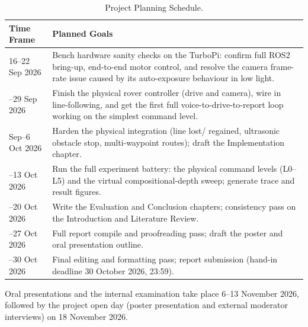 \begin{table}[htbp]
    \centering
    \caption{Project Planning Schedule.}
    \label{tab:planning}
    \begin{tabular}{p{3.2cm}p{9.5cm}}
        \toprule
        Time Frame & Planned Goals \\
        \midrule
        16--22 Sep 2026 & Bench hardware sanity checks on the TurboPi: confirm
        full ROS2 bring-up, end-to-end motor control, and resolve the camera
        frame-rate issue caused by its auto-exposure behaviour in low light. \\
        \addlinespace
        23--29 Sep 2026 & Finish the physical rover controller (drive and
        camera), wire in line-following, and get the first full
        voice-to-drive-to-report loop working on the simplest command level. \\
        \addlinespace
        30 Sep--6 Oct 2026 & Harden the physical integration (line lost/
        regained, ultrasonic obstacle stop, multi-waypoint routes); draft the
        Implementation chapter. \\
        \addlinespace
        7--13 Oct 2026 & Run the full experiment battery: the physical command
        levels (L0--L5) and the virtual compositional-depth sweep; generate
        trace and result figures. \\
        \addlinespace
        14--20 Oct 2026 & Write the Evaluation and Conclusion chapters;
        consistency pass on the Introduction and Literature Review. \\
        \addlinespace
        21--27 Oct 2026 & Full report compile and proofreading pass; draft the
        poster and oral presentation outline. \\
        \addlinespace
        28--30 Oct 2026 & Final editing and formatting pass; report submission
        (hand-in deadline 30 October 2026, 23:59). \\
        \bottomrule
    \end{tabular}
\end{table}

Oral presentations and the internal examination take place 6--13 November
2026, followed by the project open day (poster presentation and external
moderator interviews) on 18 November 2026.

